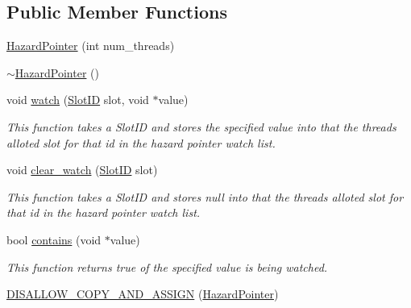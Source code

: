 \subsection*{Public Member Functions}
\begin{DoxyCompactItemize}
\item 
\hyperlink{classtervel_1_1util_1_1memory_1_1hp_1_1_hazard_pointer_a0dbe6dd92b03ef114c42df84fb3a5890}{Hazard\+Pointer} (int num\+\_\+threads)
\item 
\hyperlink{classtervel_1_1util_1_1memory_1_1hp_1_1_hazard_pointer_a97e562a1f8ff2941576df361eb987645}{$\sim$\+Hazard\+Pointer} ()
\item 
void \hyperlink{classtervel_1_1util_1_1memory_1_1hp_1_1_hazard_pointer_ab01efc169d99bc39c5bd9cbc4f6dcfaa}{watch} (\hyperlink{classtervel_1_1util_1_1memory_1_1hp_1_1_hazard_pointer_a390f6869150121a40b300b955198b897}{Slot\+I\+D} slot, void $\ast$value)
\begin{DoxyCompactList}\small\item\em This function takes a Slot\+I\+D and stores the specified value into that the threads alloted slot for that id in the hazard pointer watch list. \end{DoxyCompactList}\item 
void \hyperlink{classtervel_1_1util_1_1memory_1_1hp_1_1_hazard_pointer_a3c17a4d058f1a85927fd9b16f05c7f35}{clear\+\_\+watch} (\hyperlink{classtervel_1_1util_1_1memory_1_1hp_1_1_hazard_pointer_a390f6869150121a40b300b955198b897}{Slot\+I\+D} slot)
\begin{DoxyCompactList}\small\item\em This function takes a Slot\+I\+D and stores null into that the threads alloted slot for that id in the hazard pointer watch list. \end{DoxyCompactList}\item 
bool \hyperlink{classtervel_1_1util_1_1memory_1_1hp_1_1_hazard_pointer_ab2bff99dd52c7e31dbca3a22ad56686f}{contains} (void $\ast$value)
\begin{DoxyCompactList}\small\item\em This function returns true of the specified value is being watched. \end{DoxyCompactList}\item 
\hyperlink{classtervel_1_1util_1_1memory_1_1hp_1_1_hazard_pointer_a5466b42f3da363b0e855d525752956ed}{D\+I\+S\+A\+L\+L\+O\+W\+\_\+\+C\+O\+P\+Y\+\_\+\+A\+N\+D\+\_\+\+A\+S\+S\+I\+G\+N} (\hyperlink{classtervel_1_1util_1_1memory_1_1hp_1_1_hazard_pointer}{Hazard\+Pointer})
\end{DoxyCompactItemize}
